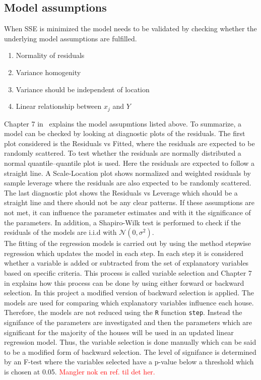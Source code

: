 \subsection{Model assumptions}
\noindent When SSE is minimized the model needs to be validated by checking whether the underlying model assumptions are fulfilled.
\begin{enumerate} [label=\textbf{\arabic*}]
    \item Normality of residuals
    \item Variance homogenity
    \item Variance should be independent of location
    \item Linear relationship between $x_j$ and $Y$
\end{enumerate}
Chapter 7 in \cite{Stat_bog} explains the model assupmtions listed above. To summarize, a model can be checked by looking at diagnostic plots of the residuals. The first plot considered is the Residuals vs Fitted, where the residuals are expected to be randomly scattered. To test whether the residuals are normally distributed a normal quantile–quantile plot is used. Here the residuals are expected to follow a straight line. A Scale-Location plot shows normalized and weighted residuals by sample leverage where the residuals are also expected to be randomly scattered. The last diagnostic plot shows the Residuals vs Leverage which should be a straight line and there should not be any clear patterns. If these assumptions are not met, it can influence the parameter estimates and with it the significance of the parameters. In addition, a Shapiro-Wilk test is performed to check if the residuals of the models are i.i.d with $\mathcal{N}(0,\sigma^2)$. \\

\noindent The fitting of the regression models is carried out by using the method stepwise regression which updates the model in each step. In each step it is considered whether a variable is added or subtracted from the set of explanatory variables based on specific criteria. This process is called variable selection and Chapter 7 in \cite{Stat_bog2} explains how this process can be done by using either forward or backward selection. In this project a modified version of backward selection is applied. The models are used for comparing which explanatory variables influence each house. Therefore, the models are not reduced using the \texttt{R} function \texttt{step}. Instead the signifance of the parameters are investigated and then the parameters which are significant for the majority of the houses will be used in an updated linear regression model. Thus, the variable selection is done manually which can be said to be a modified form of backward selection. The level of signifance is determined by an F-test where the variables selected have a p-value below a threshold which is chosen at 0.05. \textcolor{red}{Mangler nok en ref. til det her.}\\

